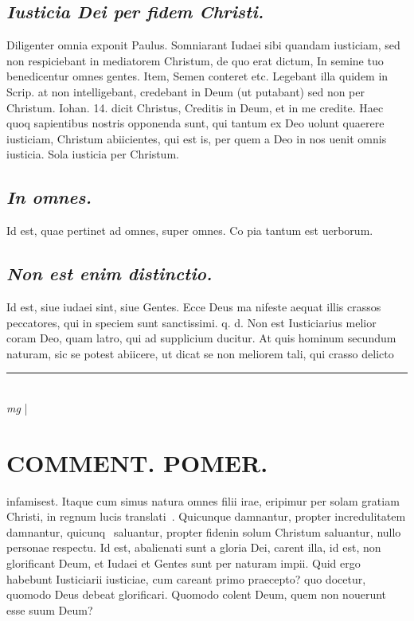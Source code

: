 \documentclass{article}
\begin{document}
\begin{pages}
\subsection*{\textit{Iusticia Dei per fidem Christi. }}\pstart Diligenter omnia exponit Paulus. Somniarant Iudaei sibi quandam iusticiam, sed non respiciebant in mediatorem Christum, de quo erat dictum, In semine tuo benedicentur omnes gentes. Item, Semen conteret etc. Legebant illa quidem in Scrip. at non intelligebant, credebant in Deum (ut putabant) sed non per Christum. Iohan. 14. dicit Christus, Creditis in Deum, et in me credite. Haec quoq sapientibus nostris opponenda sunt, qui tantum ex Deo uolunt quaerere iusticiam, Christum abiicientes, qui est is, per quem a Deo in nos uenit omnis iusticia.  Sola iusticia per Christum.   \pend
{}
{}
\subsection*{\textit{In omnes. }}\pstart Id est, quae pertinet ad omnes, super omnes. Co pia tantum est uerborum.   \pend
{}
{}
\subsection*{\textit{Non est enim distinctio. }}\pstart Id est, siue iudaei sint, siue Gentes. Ecce Deus ma nifeste aequat illis crassos peccatores, qui in speciem sunt sanctissimi. q. d. Non est Iusticiarius melior coram Deo, quam latro, qui ad supplicium ducitur.  At quis hominum secundum naturam, sic se potest abiicere, ut dicat se non meliorem tali, qui crasso delicto  \pend
\vspace{0.5cm}\noindent
\vspace{0.2cm}\rule{1cm}{0.2pt}\\ 
\hspace{0.2cm}\textit{mg}
\footnotesize 
\normalsize| 
\section*{COMMENT. POMER.  }\pstart infamisest. Itaque cum simus natura omnes filii irae, eripimur per solam gratiam Christi, in regnum lucis translati . Quicunque damnantur, propter incredulitatem damnantur, quicunq saluantur, propter fidenin solum Christum saluantur, nullo personae respectu.  \pend\pstart Id est, abalienati sunt a gloria Dei, carent illa, id est, non glorificant Deum, et Iudaei et Gentes sunt per naturam impii. Quid ergo habebunt Iusticiarii iusticiae, cum careant primo praecepto? quo docetur, quomodo Deus debeat glorificari. Quomodo colent Deum, quem non nouerunt esse suum Deum?  \pend
{}
{}

\end{pages}
\end{document}

